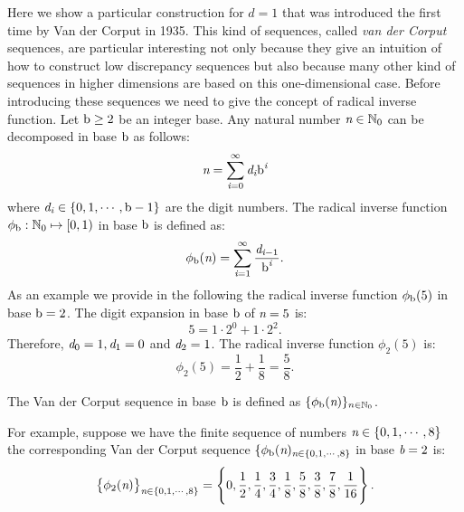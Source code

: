 Here we show a particular construction for $d=1$ that was introduced the first time by Van der Corput in 1935.  
This kind of sequences, called \textit{van der Corput} sequences, are particular interesting not only because they give an intuition of how to construct low discrepancy sequences but also because many other kind of sequences in higher dimensions are based on this one-dimensional case. Before introducing these sequences we need to give the concept of radical inverse function. Let $\textrm{b}\geq 2$ be an integer base. Any natural number $\textit{n}\in \mathbb{N}_0$ can be decomposed in base $\textrm{b}$ as follows:
\begin{equation}
\textit{n} = \sum_{\textit{i}=0}^\infty \textit{d}_{\textit{i}}\textrm{b}^{\textit{i}}
\end{equation}
where $\textit{d}_{\textit{i}} \in \{0, 1, \cdots, \textrm{b}-1\}$ are the digit numbers.
The radical inverse function $\phi_{\textrm{b}}:\mathbb{N}_0\mapsto [0,1)$ in base $\textrm{b}$ is defined as:
\begin{equation}
\phi_{\textrm{b}}(\textit{n}) = \sum_{\textit{i}=1}^{\infty}\frac{\textit{d}_{\textit{i}-1}}{\textrm{b}^{\textit{i}}}.
\end{equation}
As an example we provide in the following the radical inverse function $\phi_{\textrm{b}}(5)$ in base $\textrm{b} = 2$. 
The digit expansion in base $\textrm{b}$ of $\textit{n}=5$ is:
\begin{equation}
5 = 1\cdot 2^0+1\cdot 2^2.
\end{equation}
Therefore, $\textit{d}_0 = 1, \textit{d}_1 = 0$ and $\textit{d}_2 = 1$. 
The radical inverse function $\phi_2(5)$ is:
\begin{equation}
\phi_2 (5) = \frac{1}{2}+\frac{1}{8} = \frac{5}{8}.
\end{equation}
\begin{definition}
The Van der Corput sequence in base $\textrm{b}$ is defined as $\{ \phi_{\textrm{b}}(\textit{n})\}_{n\in\mathbb{N}_0}$.
\end{definition}
For example, suppose we have the finite sequence of numbers $\textit{n}\in \{0, 1,\cdots, 8\}$  the corresponding Van der Corput sequence 
$\{ \phi_{\textrm{b}}(\textit{n})_{\textit{n}\in \{0, 1,\cdots, 8\}}$ in base $\textit{b}=2$ is:
\begin{equation}
\big\{\phi_2(\textit{n})\big\}_{\textit{n}\in \{0, 1,\cdots, 8\}} = \Bigg\{0, \frac{1}{2}, \frac{1}{4}, \frac{3}{4}, \frac{1}{8},\frac{5}{8}, \frac{3}{8}, \frac{7}{8}, \frac{1}{16}\Bigg\} \,.
\end{equation}
